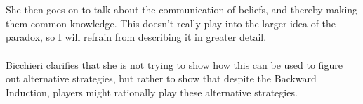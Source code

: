 \documentclass{article}
\begin{document}
\\
\\
She then goes on to talk about the communication of beliefs, and thereby making them common knowledge. This doesn't really play into the larger idea of the paradox, so I will refrain from describing it in greater detail.
\\
\\
Bicchieri clarifies that she is not trying to show how this can be used to figure out alternative strategies, but rather to show that despite the Backward Induction, players might rationally play these alternative strategies.
\end{document}
